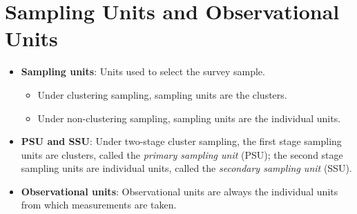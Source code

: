 \documentclass[oneside]{book}\usepackage[]{graphicx}\usepackage[svgnames]{xcolor}
\begin{document}
\section*{Sampling Units and Observational Units}
\begin{Regular}{}
      \begin{itemize}
            \item \textbf{Sampling units}: Units used to select the survey sample.
                  \begin{itemize}
                        \item Under clustering sampling, sampling units are the clusters.
                        \item Under non-clustering sampling, sampling units are the individual
                              units.
                  \end{itemize}
            \item \textbf{PSU and SSU}: Under two-stage cluster sampling, the first stage
                  sampling units are clusters, called the \emph{primary sampling unit}
                  (PSU); the second stage sampling units are individual units,
                  called the \emph{secondary sampling unit} (SSU).
            \item \textbf{Observational units}: Observational units are always the individual units from which
                  measurements are taken.
      \end{itemize}
\end{Regular}
\end{document}
